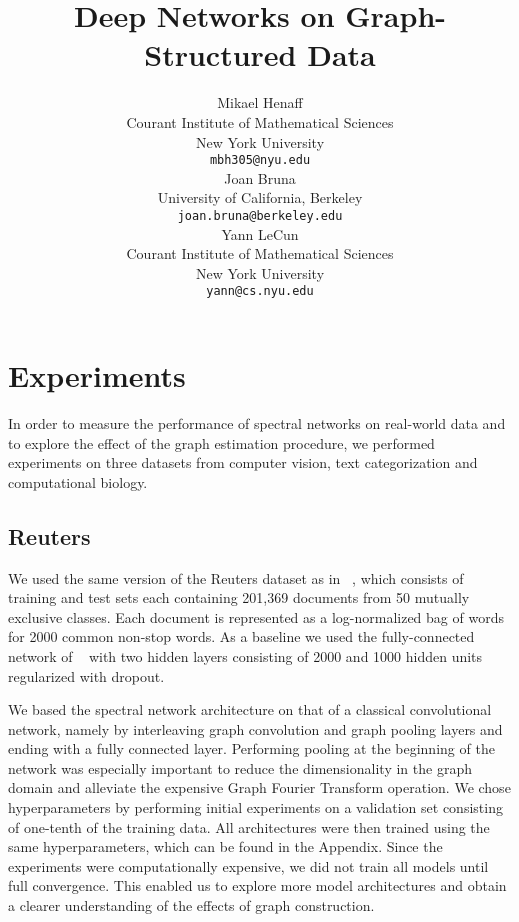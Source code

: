 \documentclass{article} %
\title{Deep Networks on Graph-Structured Data}
\author{
Mikael Henaff \\
Courant Institute of Mathematical Sciences\\
New York University\\
\texttt{mbh305@nyu.edu} \\
\And
Joan Bruna \\
University of California, Berkeley \\
\texttt{joan.bruna@berkeley.edu} \\
\AND
Yann LeCun \\
Courant Institute of Mathematical Sciences \\
New York University \\
\texttt{yann@cs.nyu.edu} \\
}
\begin{document}
\maketitle

\begin{abstract}

\end{abstract}

\section{Experiments}

In order to measure the performance of spectral networks on real-world data and to explore the effect of the graph estimation procedure, we performed experiments on three datasets from computer vision, text categorization and computational biology. 

\subsection{Reuters}

We used the same version of the Reuters dataset as in ~\cite{Hinton2012}, which consists of training and test sets each containing 201,369 documents from 50 mutually exclusive classes. Each document is represented as a log-normalized bag of words for 2000 common non-stop words. As a baseline we used the fully-connected network of ~\cite{Hinton2012} with two hidden layers consisting of 2000 and 1000 hidden units regularized with dropout.  

We based the spectral network architecture on that of a classical convolutional network, namely by interleaving graph convolution and graph pooling layers and ending with a fully connected layer. Performing pooling at the beginning of the network was especially important to reduce the dimensionality in the graph domain and alleviate the expensive Graph Fourier Transform operation.  We chose hyperparameters by performing initial experiments on a validation set consisting of one-tenth of the training data. All architectures were then trained using the same hyperparameters, which can be found in the Appendix. 
Since the experiments were computationally expensive, we did not train all models until full convergence. This enabled us to explore more model architectures and obtain a clearer understanding of the effects of graph construction.  
\end{document}
